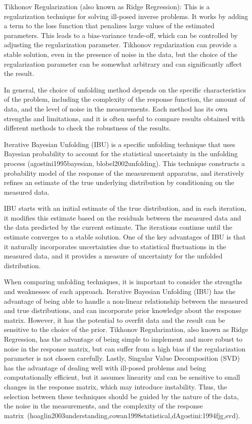     Tikhonov Regularization (also known as Ridge Regression): This is a regularization technique for solving ill-posed inverse problems. It works by adding a term to the loss function that penalizes large values of the estimated parameters. This leads to a bias-variance trade-off, which can be controlled by adjusting the regularization parameter. Tikhonov regularization can provide a stable solution, even in the presence of noise in the data, but the choice of the regularization parameter can be somewhat arbitrary and can significantly affect the result.
    
    In general, the choice of unfolding method depends on the specific characteristics of the problem, including the complexity of the response function, the amount of data, and the level of noise in the measurements. Each method has its own strengths and limitations, and it is often useful to compare results obtained with different methods to check the robustness of the results.

    Iterative Bayesian Unfolding (IBU) is a specific unfolding technique that uses Bayesian probability to account for the statistical uncertainty in the unfolding process (agostini1995bayesian, blobel2002unfolding). This technique constructs a probability model of the response of the measurement apparatus, and iteratively refines an estimate of the true underlying distribution by conditioning on the measured data.
    
    IBU starts with an initial estimate of the true distribution, and in each iteration, it modifies this estimate based on the residuals between the measured data and the data predicted by the current estimate. The iterations continue until the estimate converges to a stable solution. One of the key advantages of IBU is that it naturally incorporates uncertainties due to statistical fluctuations in the measured data, and it provides a measure of uncertainty for the unfolded distribution.
    
    When comparing unfolding techniques, it is important to consider the strengths and weaknesses of each approach. Iterative Bayesian Unfolding (IBU) has the advantage of being able to handle a non-linear relationship between the measured and true distributions, and can incorporate prior knowledge about the response matrix. However, it has the potential to overfit data and the result can be sensitive to the choice of the prior. Tikhonov Regularization, also known as Ridge Regression, has the advantage of being simple to implement and more robust to noise in the response matrix, but can suffer from a high bias if the regularization parameter is not chosen carefully. Lastly, Singular Value Decomposition (SVD) has the advantage of dealing well with ill-posed problems and being computationally efficient, but it assumes linearity and can be sensitive to small changes in the response matrix, which may introduce instability. Thus, the selection between these techniques should be guided by the nature of the data, the noise in the measurements, and the complexity of the response matrix~(hoaglin2003understanding,cowan1998statistical,dAgostini:1994fjg,svd).
    
